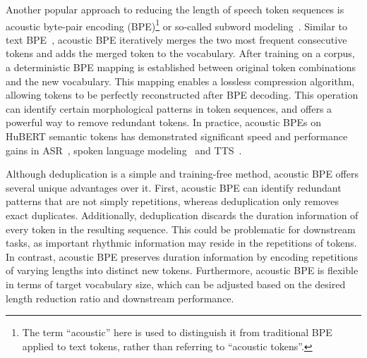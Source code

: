 Another popular approach to reducing the length of speech token sequences is acoustic byte-pair encoding (BPE)\footnote{The term ``acoustic'' here is used to distinguish it from traditional BPE applied to text tokens, rather than referring to ``acoustic tokens''.} or so-called subword modeling~\cite{hayashi2020discretalk,ren22_interspeech,chang23b_interspeech,shen2024acoustic,dekel24_interspeech}.
Similar to text BPE~\cite{Gage1994ANA}, acoustic BPE iteratively merges the two most frequent consecutive tokens and adds the merged token to the vocabulary.
After training on a corpus, a deterministic BPE mapping is established between original token combinations and the new vocabulary. 
This mapping enables a lossless compression algorithm, allowing tokens to be perfectly reconstructed after BPE decoding.
This operation can identify certain morphological patterns in token sequences, and offers a powerful way to remove redundant tokens.
In practice, acoustic BPEs on HuBERT semantic tokens has demonstrated significant speed and performance gains in ASR~\cite{chang23b_interspeech,chang2024exploring}, spoken language modeling~\cite{shen2024acoustic,dekel24_interspeech} and TTS~\cite{li24qa_interspeech,vectokspeech}.

Although deduplication is a simple and training-free method, acoustic BPE offers several unique advantages over it. First, acoustic BPE can identify redundant patterns that are not simply repetitions, whereas deduplication only removes exact duplicates. Additionally, deduplication discards the duration information of every token in the resulting sequence. This could be problematic for downstream tasks, as important rhythmic information may reside in the repetitions of tokens. In contrast, acoustic BPE preserves duration information by encoding repetitions of varying lengths into distinct new tokens. Furthermore, acoustic BPE is flexible in terms of target vocabulary size, which can be adjusted based on the desired length reduction ratio and downstream performance.


